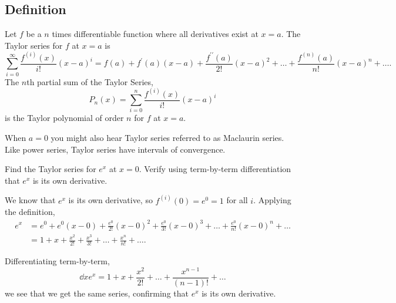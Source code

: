 \subsection{Definition}
\begin{definition}
	Let $f$ be a $n$ times differentiable function where all derivatives exist at $x=a$.
	The Taylor series for $f$ at $x=a$ is
	\begin{equation*}
		\sum_{i=0}^{\infty}{\frac{f^{(i)}(x)}{i!}(x-a)^i} = f(a) + f^\prime(a)(x-a) + \frac{f^{\prime\prime}(a)}{2!}(x-a)^2 + \ldots + \frac{f^{(n)}(a)}{n!}(x-a)^n + \ldots.
	\end{equation*}
	The $n$th partial sum of the Taylor Series,
	\begin{equation*}
		P_n(x) = \sum_{i=0}^{n}{\frac{f^{(i)}(x)}{i!}(x-a)^i}
	\end{equation*}
	is the Taylor polynomial of order $n$ for $f$ at $x=a$.
\end{definition}

When $a=0$ you might also hear Taylor series referred to as Maclaurin series.
Like power series, Taylor series have intervals of convergence.

\begin{example}
	Find the Taylor series for $e^x$ at $x=0$.
	Verify using term-by-term differentiation that $e^x$ is its own derivative.
\end{example}
\begin{answer}
	We know that $e^x$ is its own derivative, so $f^{(i)}(0)=e^0 = 1$ for all $i$.
	Applying the definition,
	\begin{align*}
		e^x &= e^0 + e^0(x-0) + \frac{e^0}{2!}(x-0)^2 + \frac{e^0}{3!}(x-0)^3 + \ldots + \frac{e^0}{n!}(x-0)^n + \ldots \\
		&= 1 + x + \frac{x^2}{2!} + \frac{x^3}{3!} + \ldots + \frac{x^n}{n!} + \ldots.
	\end{align*}
	
	Differentiating term-by-term,
	\begin{equation*}
		\dd{}{x}e^x = 1 + x + \frac{x^2}{2!} + \ldots + \frac{x^{n-1}}{(n-1)!} + \ldots
	\end{equation*}
	we see that we get the same series, confirming that $e^x$ is its own derivative.
\end{answer}

